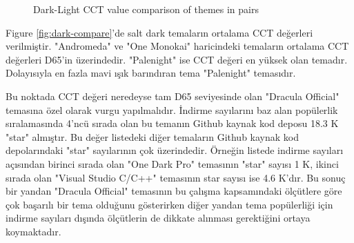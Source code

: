 \documentclass{article}
\begin{document}
\begin{figure}[h]
  \caption{Dark-Light CCT value comparison of themes in pairs}
  \label{fig:dark-light-pair-compare}
\end{figure}

Figure \ref{fig:dark-compare}'de salt dark temaların ortalama CCT değerleri verilmiştir. "Andromeda" ve "One Monokai"
haricindeki temaların ortalama CCT değerleri D65'in üzerindedir. "Palenight" ise CCT değeri en yüksek olan temadır.
Dolayısıyla en fazla mavi ışık barındıran tema "Palenight" temasıdır.

Bu noktada CCT değeri neredeyse tam D65 seviyesinde olan "Dracula Official" temasına özel olarak vurgu yapılmalıdır.
İndirme sayılarını baz alan popülerlik sıralamasında 4'ncü sırada olan bu temanın Github kaynak kod deposu 18.3 K "star"
almıştır\cite{draculatheme2022github}.  Bu değer listedeki diğer temaların Github kaynak kod depolarındaki "star"
sayılarının çok üzerindedir.  Örneğin listede indirme sayıları açısından birinci sırada olan "One Dark Pro" temasının
"star" sayısı 1 K\cite{onedarkprotheme2022github}, ikinci sırada olan "Visual Studio C/C++" temasının star sayısı ise
4.6 K'dır\cite{visualstudiotheme2022github}.  Bu sonuç bir yandan "Dracula Official" temasının bu çalışma kapsamındaki
ölçütlere göre çok başarılı bir tema olduğunu gösterirken diğer yandan tema popülerliği için indirme sayıları dışında
ölçütlerin de dikkate alınması gerektiğini ortaya koymaktadır.
\end{document}
